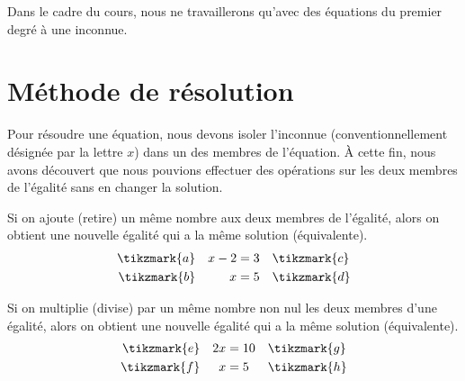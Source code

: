 \documentclass[../../syllabus_2.tex]{subfiles}
\begin{document}

 Dans le cadre du cours, nous ne travaillerons qu'avec des équations du premier degré à une inconnue.

\newpage
\section{Méthode de résolution}

Pour résoudre une équation, nous devons isoler l'inconnue (conventionnellement désignée par la lettre $x$) dans un des membres de l'équation. À cette fin, nous avons découvert que nous pouvions effectuer des opérations sur les deux membres de l'égalité sans en changer la solution.

\begin{tcolorbox}[title=Les principes d'équivalences]
  Si on ajoute (retire) un même nombre aux deux membres de l'égalité, alors on obtient une nouvelle égalité qui a la même solution (équivalente).
  \begin{equation*}
    \begin{aligned}
     \tikzmark{a} && x-2 & = 3 &&\tikzmark{c}\\
     \tikzmark{b} && x   & = 5 &&\tikzmark{d} 
   \end{aligned}
\end{equation*}


  Si on multiplie (divise) par un même nombre non nul les deux membres d'une égalité, alors on obtient une nouvelle égalité qui a la même solution (équivalente).
  \begin{equation*}
    \begin{aligned}
     \tikzmark{e} && 2x & = 10 &&\tikzmark{g}\\
     \tikzmark{f} && x   & = 5 &&\tikzmark{h} 
   \end{aligned}
\end{equation*}

\end{tcolorbox}
\end{document}

